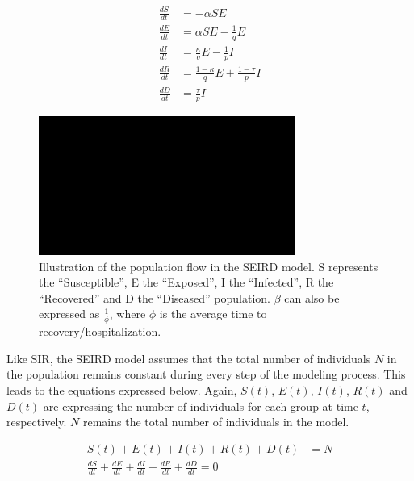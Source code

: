 \begin{align}
	\frac{dS}{dt} &= -\alpha S E \label{eq:SEIRD1_S} \\
	\frac{dE}{dt} &= \alpha S E -\frac{1}{q} E \label{eq:SEIRD1_E} \\
	\frac{dI}{dt} &= \frac{\kappa}{q} E - \frac{1}{p} I \label{eq:SEIRD1_I} \\
	\frac{dR}{dt} &= \frac{1-\kappa}{q} E + \frac{1-\tau}{p} I \label{eq:SEIRD1_R} \\
	\frac{dD}{dt} &= \frac{\tau}{p} I \label{eq:SEIRD1_D} 
\end{align}


\begin{figure}
	\begin{center}
		\includegraphics[width=0.75\textwidth]{./figures/SEIRD.png}
		\caption{Illustration of the population flow in the SEIRD model. S represents the ``Susceptible'', E the ``Exposed'',
			I the ``Infected'', R the ``Recovered'' and D the ``Diseased'' population. $\beta$ can also be expressed as
			$\frac{1}{\phi}$, where $\phi$ is the average time to recovery/hospitalization.}
		\label{fig:SEIRD}
	\end{center}
\end{figure}



Like SIR, the SEIRD model assumes that the total number of individuals $N$ in the population remains constant during every step
of the modeling process. This leads to the equations expressed below. Again, $S(t)$, $E(t)$, $I(t)$, $R(t)$ and $D(t)$ are
expressing the number of individuals for each group at time $t$, respectively. $N$ remains the total number of individuals in the model.

\begin{align}
	\label{eq:SEIRD2}
	S(t) + E(t) + I(t) + R(t) + D(t) &= N \\
	\frac{dS}{dt} + \frac{dE}{dt}  + \frac{dI}{dt} + \frac{dR}{dt} + \frac{dD}{dt} = 0
\end{align}


